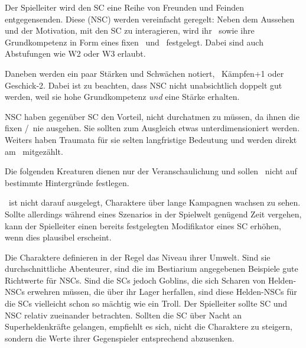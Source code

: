 {	

		\noindent
		Der Spielleiter wird den SC eine Reihe von Freunden und Feinden entgegensenden. Diese  (NSC) werden vereinfacht geregelt: Neben dem Aussehen und der Motivation, mit den SC zu interagieren, wird ihr \HD\ sowie ihre Grundkompetenz in Form eines fixen \AD\ und \RD\ festgelegt. Dabei sind auch Abstufungen wie W2 oder W3 erlaubt.

		\nipajinTableNSC

		\noindent
		Daneben werden ein paar Stärken und Schwächen notiert, \zB\ Kämpfen+1 oder Geschick-2. Dabei ist zu beachten, dass NSC nicht unabsichtlich doppelt gut werden, weil sie hohe Grundkompetenz \emph{und} eine Stärke erhalten.

		NSC haben gegenüber SC den Vorteil, nicht durchatmen zu müssen, da ihnen die fixen \AD/\RD\ nie ausgehen. Sie sollten zum Ausgleich etwas unterdimensioniert werden. Weiters haben Traumata für sie selten langfristige Bedeutung und werden direkt am \HD\ mitgezählt.


		\noindent
		Die folgenden Kreaturen dienen nur der Veranschaulichung und sollen \nipajin\ nicht auf bestimmte Hintergründe festlegen.

		\nipajinTableBestiary


		\noindent
		\nipajin\ ist nicht darauf ausgelegt, Charaktere über lange Kampagnen wachsen zu sehen. Sollte allerdings während eines Szenarios in der Spielwelt genügend Zeit vergehen, kann der Spielleiter einen bereits festgelegten Modifikator eines SC erhöhen, wenn dies plausibel erscheint.

		Die Charaktere definieren in der Regel das Niveau ihrer Umwelt. Sind sie durchschnittliche Abenteurer, sind die im Bestiarium angegebenen Beispiele gute Richtwerte für NSCs. Sind die SCs jedoch Goblins, die sich Scharen von Helden-NSCs erwehren müssen, die über ihr Lager herfallen, sind diese Helden-NSCs für die SCs vielleicht schon so mächtig wie ein Troll. Der Spielleiter sollte SC und NSC relativ zueinander betrachten. Sollten die SC über Nacht an Super\-hel\-den\-kräfte gelangen, empfiehlt es sich, nicht die Charaktere zu steigern, sondern die Werte ihrer Gegenspieler entsprechend abzusenken.
}
